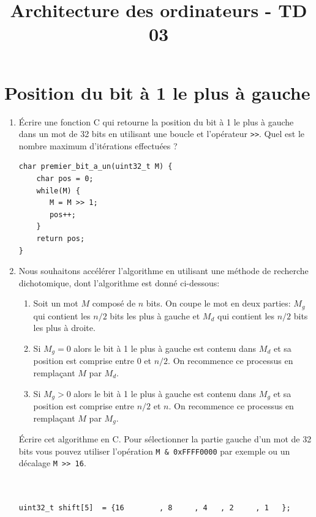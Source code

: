 \documentclass[a4paper,10pt]{exam}
\title{Architecture des ordinateurs - TD 03}
\author{}
\date{}
\begin{document}
\maketitle

\section{Position du bit à 1 le plus à gauche}
\begin{enumerate}
  \item Écrire une fonction C qui retourne la position du bit à 1
    le plus à gauche dans un mot de 32 bits en utilisant une boucle
    et l'opérateur \verb!>>!. Quel est le nombre maximum d'itérations
    effectuées ?
    \begin{solution}
\begin{verbatim}
char premier_bit_a_un(uint32_t M) {
    char pos = 0;
    while(M) {
       M = M >> 1;
       pos++;
    }
    return pos;
}
\end{verbatim}
    \end{solution}
  \item Nous souhaitons accélérer l'algorithme en utilisant une méthode
    de recherche dichotomique, dont l'algorithme est donné ci-dessous:
    \begin{enumerate}
      \item Soit un mot $M$ composé de $n$ bits. On coupe le mot en deux
        parties: $M_g$ qui contient les $n/2$ bits les plus à gauche et $M_d$
        qui contient les $n/2$ bits les plus à droite.
      \item Si $M_g = 0$ alors le bit à 1 le plus à gauche est contenu dans
        $M_d$ et sa position est comprise entre $0$ et $n/2$. On recommence
        ce processus en remplaçant $M$ par $M_d$.
      \item Si $M_g > 0$ alors le bit à 1 le plus à gauche est contenu dans
        $M_g$ et sa position est comprise entre $n/2$ et $n$. On recommence
        ce processus en remplaçant $M$ par $M_g$.
    \end{enumerate}

    Écrire cet algorithme en C. Pour sélectionner la partie gauche d'un mot de
    32 bits vous pouvez utiliser l'opération \texttt{M \& 0xFFFF0000} par exemple
    ou un décalage \verb!M >> 16!.

    \begin{solution}
\begin{verbatim}


uint32_t shift[5]  = {16        , 8     , 4   , 2     , 1   };


\end{verbatim}
\end{solution}
\end{enumerate}
\end{document}
